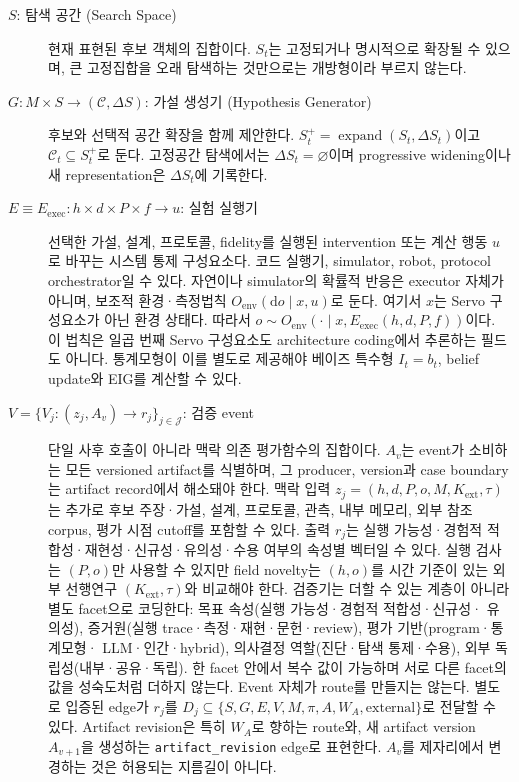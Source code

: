 \documentclass[11pt]{article}
\begin{document}
\begin{description}
  \item[$S$: 탐색 공간 (Search Space)] 현재 표현된 후보 객체의 집합이다. $S_t$는 고정되거나 명시적으로 확장될 수 있으며, 큰 고정집합을 오래 탐색하는 것만으로는 개방형이라 부르지 않는다.

  \item[$G: M \times S \rightarrow (\mathcal C,\Delta S)$: 가설 생성기 (Hypothesis Generator)] 후보와 선택적 공간 확장을 함께 제안한다. $S_t^+=\operatorname{expand}(S_t,\Delta S_t)$이고 $\mathcal C_t\subseteq S_t^+$로 둔다. 고정공간 탐색에서는 $\Delta S_t=\varnothing$이며 progressive widening이나 새 representation은 $\Delta S_t$에 기록한다.

  \item[$E\equiv E_{\mathrm{exec}}:h\times d\times P\times f\rightarrow u$: 실험 실행기] 선택한 가설,
  설계, 프로토콜, fidelity를 실행된 intervention 또는 계산 행동 $u$로 바꾸는 시스템 통제
  구성요소다. 코드 실행기, simulator, robot, protocol orchestrator일 수 있다. 자연이나
  simulator의 확률적 반응은 executor 자체가 아니며, 보조적 환경·측정법칙
  $O_{\mathrm{env}}(\mathrm{d}o\mid x,u)$로 둔다. 여기서 $x$는 Servo 구성요소가 아닌
  환경 상태다. 따라서
  $o\sim O_{\mathrm{env}}(\cdot\mid x,E_{\mathrm{exec}}(h,d,P,f))$이다. 이 법칙은 일곱 번째
  Servo 구성요소도 architecture coding에서 추론하는 필드도 아니다. 통계모형이 이를
  별도로 제공해야 베이즈 특수형 $I_t=b_t$, belief update와 EIG를 계산할 수 있다.

  \item[$V=\{V_j:(z_j,A_v)\rightarrow r_j\}_{j\in\mathcal J}$: 검증 event] 단일 사후 호출이 아니라 맥락 의존 평가함수의 집합이다. $A_v$는 event가 소비하는 모든 versioned artifact를 식별하며, 그 producer, version과 case boundary는 artifact record에서 해소돼야 한다. 맥락 입력
  $z_j=(h,d,P,o,M,K_{\mathrm{ext}},\tau)$는 추가로 후보 주장·가설, 설계, 프로토콜, 관측,
  내부 메모리, 외부 참조 corpus, 평가 시점 cutoff를 포함할 수 있다. 출력 $r_j$는
  실행 가능성·경험적 적합성·재현성·신규성·유의성·수용 여부의 속성별 벡터일 수
  있다. 실행 검사는 $(P,o)$만 사용할 수 있지만 field novelty는 $(h,o)$를 시간 기준이
  있는 외부 선행연구 $(K_{\mathrm{ext}},\tau)$와 비교해야 한다. 검증기는 더할 수 있는
  계층이 아니라 별도 facet으로 코딩한다: 목표 속성(실행 가능성·경험적 적합성·신규성·
  유의성), 증거원(실행 trace·측정·재현·문헌·review), 평가 기반(program·통계모형·
  LLM·인간·hybrid), 의사결정 역할(진단·탐색 통제·수용), 외부 독립성(내부·공유·독립).
  한 facet 안에서 복수 값이 가능하며 서로 다른 facet의 값을 성숙도처럼 더하지 않는다. Event 자체가 route를 만들지는 않는다. 별도로 입증된 edge가 $r_j$를
  $D_j\subseteq\{S,G,E,V,M,\pi,A,W_A,\text{external}\}$로 전달할 수 있다. Artifact revision은 특히 $W_A$로 향하는 route와, 새 artifact version $A_{v+1}$을 생성하는 \texttt{artifact\_revision} edge로 표현한다. $A_v$를 제자리에서 변경하는 것은 허용되는 지름길이 아니다.


\end{description}
\end{document}
